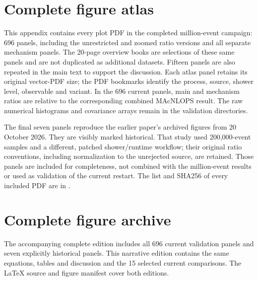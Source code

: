 \documentclass[11pt,a4paper]{article}
\newcommand{\macnlops}{MAcNLOPS}
\newcommand{\code}[1]{\texttt{\small #1}}
\begin{document}
\section{Complete figure atlas}
\label{sec:atlas}
This appendix contains every plot PDF in the completed million-event
campaign: 696 panels, including the unrestricted and zoomed ratio
versions and all separate mechanism panels. The 20-page overview books
are selections of these same panels and are not duplicated as additional
datasets. Fifteen panels are also repeated in the main text to support
the discussion. Each atlas panel retains its original vector-PDF size;
the PDF bookmarks identify the process, source, shower level, observable
and variant. In the 696 current panels, main and mechanism ratios are relative to the
corresponding combined \macnlops{} result. The raw numerical histograms
and covariance arrays remain in the validation directories.

The final seven panels reproduce the earlier paper's archived figures
from 20 October 2026. They are visibly marked historical. That study used
200,000-event samples and a different, patched shower/runtime workflow;
their original ratio conventions, including normalization to the
unrejected source, are retained. Those panels are included for completeness, not combined with the
million-event results or used as validation of the current restart.
The list and SHA256 of every included PDF are in
\code{}.
\clearpage

\else
\section{Complete figure archive}
The accompanying complete edition includes all 696 current validation
panels and seven explicitly historical panels. This narrative edition
contains the same equations, tables and discussion and the 15 selected
current comparisons. The LaTeX source and figure manifest cover both
editions.
\fi
\end{document}
